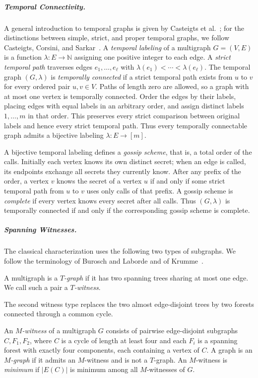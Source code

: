 \documentclass[USenglish, a4paper, thm-restate,numberwithinsect, cleveref]{lipics-v2021}
\begin{document}
\subparagraph*{Temporal Connectivity.}
A general introduction to temporal graphs is given by Casteigts et
al.~\cite{casteigts2012time}; for the distinctions between simple,
strict, and proper temporal graphs, we follow Casteigts, Corsini, and
Sarkar~\cite{CasteigtsCS22}.
A \emph{temporal labeling} of a multigraph $G=(V,E)$ is a function
$\lambda\colon E\to\mathbb{N}$ assigning one positive integer to each
edge. A \emph{strict temporal path} traverses edges
$e_1,\ldots,e_\ell$ with
$\lambda(e_1)<\cdots<\lambda(e_\ell)$. The temporal graph
$(G,\lambda)$ is \emph{temporally connected} if a strict temporal path
exists from $u$ to $v$ for every ordered pair $u,v\in V$.
Paths of length zero are allowed, so a graph with at most one vertex
is temporally connected. 
Order the edges by their labels, placing edges with equal labels in
an arbitrary order, and assign distinct labels $1,\ldots,m$ in that
order. This preserves every strict comparison between original labels
and hence every strict temporal path. Thus every temporally connectable
graph admits a bijective labeling $\lambda\colon E\to[m]$.


A bijective temporal labeling defines a \emph{gossip scheme}, that is,
a total order of the calls. Initially each vertex knows its own distinct
secret; when an edge is called, its endpoints
exchange all secrets they currently know. After any prefix of the
order, a vertex $v$ knows the secret of a vertex $u$ if and only if
some strict temporal path from $u$ to $v$ uses only calls of that prefix. 
A gossip scheme is \emph{complete} if every vertex knows every
secret after all calls. Thus $(G,\lambda)$ is temporally connected if
and only if the corresponding gossip scheme is complete.

\subparagraph*{Spanning Witnesses.}
The classical characterization uses the following two types of
subgraphs. We follow the terminology of Burosch and Laborde and of
Krumme~\cite{BuroschL92,Krumme96}.
\begin{definition}
A multigraph is a \emph{$T$-graph} if it has two spanning trees sharing
at most one edge.
We call such a pair a \emph{$T$-witness}.
\end{definition}

The second witness type replaces the two almost edge-disjoint trees by
two forests connected through a common cycle.
\begin{definition}\label{def:m-graph}
An \emph{$M$-witness} of a multigraph $G$ consists of pairwise
edge-disjoint subgraphs $C,F_1,F_2$, where $C$ is a cycle of length at
least four and each $F_i$ is a spanning forest with exactly four
components, each containing a vertex of $C$. A graph is an \emph{$M$-graph} if it
admits an $M$-witness and is not a $T$-graph. An $M$-witness is
\emph{minimum} if $|E(C)|$ is minimum among all $M$-witnesses of $G$.
\end{definition}
\end{document}
